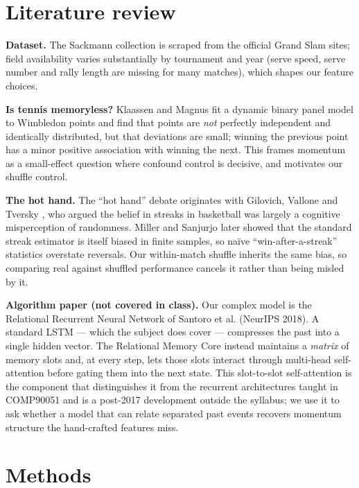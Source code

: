 \documentclass[10pt,a4paper]{article}
\begin{document}
\section{Literature review}
\textbf{Dataset.} The Sackmann collection \cite{sackmann} is scraped from the
official Grand Slam sites; field availability varies substantially by tournament
and year (serve speed, serve number and rally length are missing for many
matches), which shapes our feature choices.

\textbf{Is tennis memoryless?} Klaassen and Magnus \cite{klaassen2001} fit a
dynamic binary panel model to Wimbledon points and find that points are
\emph{not} perfectly independent and identically distributed, but that
deviations are small; winning the previous point has a minor positive
association with winning the next. This frames momentum as a small-effect
question where confound control is decisive, and motivates our shuffle control.

\textbf{The hot hand.} The ``hot hand'' debate originates with Gilovich, Vallone
and Tversky \cite{gilovich1985}, who argued the belief in streaks in basketball
was largely a cognitive misperception of randomness. Miller and Sanjurjo
\cite{miller2018} later showed that the standard streak estimator is itself
biased in finite samples, so na\"ive ``win-after-a-streak'' statistics overstate
reversals. Our within-match shuffle inherits the same bias, so comparing real
against shuffled performance cancels it rather than being misled by it.

\textbf{Algorithm paper (not covered in class).} Our complex model is the
Relational Recurrent Neural Network of Santoro et al. \cite{santoro2018}
(NeurIPS 2018). A standard LSTM --- which the subject does cover --- compresses the
past into a single hidden vector. The Relational Memory Core instead maintains a
\emph{matrix} of memory slots and, at every step, lets those slots interact
through multi-head self-attention before gating them into the next state. This
slot-to-slot self-attention is the component that distinguishes it from the
recurrent architectures taught in COMP90051 and is a post-2017 development
outside the syllabus; we use it to ask whether a model that can relate separated
past events recovers momentum structure the hand-crafted features miss.

\section{Methods}
\end{document}
